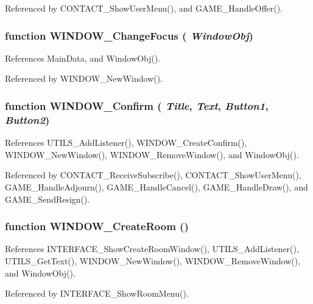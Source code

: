 Referenced by CONTACT\_\-ShowUserMenu(), and GAME\_\-HandleOffer().
\subsubsection{\setlength{\rightskip}{0pt plus 5cm}function WINDOW\_\-ChangeFocus ( {\em WindowObj})}\label{window_2window_8js_350ad94a4dacfeb72ee42df746f19cf2}




References MainData, and WindowObj().

Referenced by WINDOW\_\-NewWindow().
\subsubsection{\setlength{\rightskip}{0pt plus 5cm}function WINDOW\_\-Confirm ( {\em Title}, \/   {\em Text}, \/   {\em Button1}, \/   {\em Button2})}\label{window_2window_8js_cf8bd95031baaa8a5b88de2cc0848015}




References UTILS\_\-AddListener(), WINDOW\_\-CreateConfirm(), WINDOW\_\-NewWindow(), WINDOW\_\-RemoveWindow(), and WindowObj().

Referenced by CONTACT\_\-ReceiveSubscribe(), CONTACT\_\-ShowUserMenu(), GAME\_\-HandleAdjourn(), GAME\_\-HandleCancel(), GAME\_\-HandleDraw(), and GAME\_\-SendResign().
\subsubsection{\setlength{\rightskip}{0pt plus 5cm}function WINDOW\_\-CreateRoom ()}\label{window_2window_8js_b4a012d4090056d8eb763793e32bc5b5}




References INTERFACE\_\-ShowCreateRoomWindow(), UTILS\_\-AddListener(), UTILS\_\-GetText(), WINDOW\_\-NewWindow(), WINDOW\_\-RemoveWindow(), and WindowObj().

Referenced by INTERFACE\_\-ShowRoomMenu().
